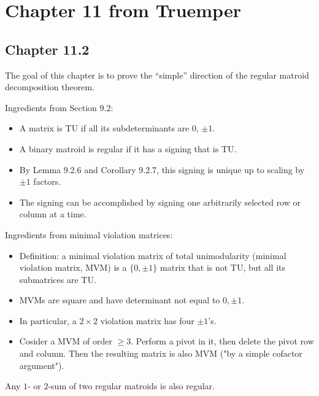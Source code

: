\section{Chapter 11 from Truemper}

\subsection{Chapter 11.2}

The goal of this chapter is to prove the ``simple'' direction of the regular matroid decomposition theorem.

Ingredients from Section 9.2: %
\begin{itemize}
  \item A matrix is TU if all its subdeterminants are $0$, $\pm 1$.
  \item A binary matroid is regular if it has a signing that is TU.
  \item By Lemma 9.2.6 and Corollary 9.2.7, this signing is unique up to scaling by $\pm 1$ factors.
  \item The signing can be accomplished by signing one arbitrarily selected row or column at a time.
\end{itemize}

Ingredients from minimal violation matrices: %
\begin{itemize}
  \item Definition: a minimal violation matrix of total unimodularity (minimal violation matrix, MVM) is a $\{0, \pm 1\}$ matrix that is not TU, but all its submatrices are TU.
  \item MVMs are square and have determinant not equal to $0, \pm 1$.
  \item In particular, a $2 \times 2$ violation matrix has four $\pm 1$'s.
  \item Cosider a MVM of order $\ge 3$. Perform a pivot in it, then delete the pivot row and column. Then the resulting matrix is also MVM ("by a simple cofactor argument").
\end{itemize}

\begin{lemma}[11.2.1]
  \label{lem:11.2.1}
  Any $1$- or $2$-sum of two regular matroids is also regular.
\end{lemma}


